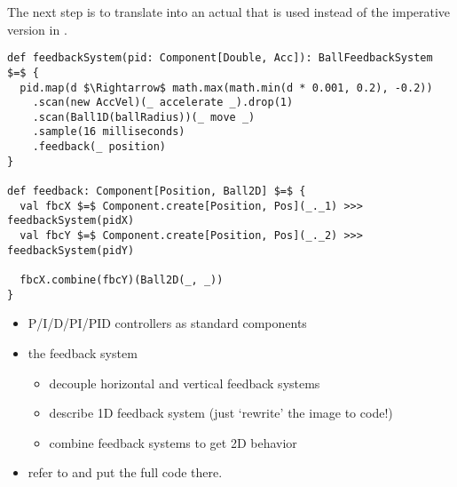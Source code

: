 The next step is to translate  into an actual  that is used instead of the imperative version in .

\begin{minipage}{\linewidth}
\begin{lstlisting}[style=ScalaStyle, caption={Ball movement feedback system}, label={lst:ball-feedback-new}]
def feedbackSystem(pid: Component[Double, Acc]): BallFeedbackSystem $=$ {
  pid.map(d $\Rightarrow$ math.max(math.min(d * 0.001, 0.2), -0.2))
    .scan(new AccVel)(_ accelerate _).drop(1)
    .scan(Ball1D(ballRadius))(_ move _)
    .sample(16 milliseconds)
    .feedback(_ position)
}

def feedback: Component[Position, Ball2D] $=$ {
  val fbcX $=$ Component.create[Position, Pos](_._1) >>> feedbackSystem(pidX)
  val fbcY $=$ Component.create[Position, Pos](_._2) >>> feedbackSystem(pidY)

  fbcX.combine(fbcY)(Ball2D(_, _))
}
\end{lstlisting}
\end{minipage}



\begin{itemize}
	\item[\checkmark] P/I/D/PI/PID controllers as standard components
	\item the feedback system
		\begin{itemize}
			\item decouple horizontal and vertical feedback systems
			\item describe 1D feedback system (just `rewrite' the image to code!)
			\item combine feedback systems to get 2D behavior
		\end{itemize}
	\item refer to  and put the full code there.
\end{itemize}